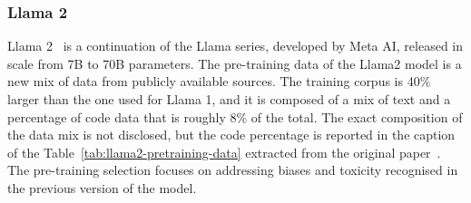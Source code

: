 \subsubsection{Llama 2}
\label{subsubsec:llama-2}

Llama 2~\cite{touvron2023llama2} is a continuation of the Llama series, developed by Meta AI, released in scale from 7B to 70B parameters.
The pre-training data of the Llama2 model is a new mix of data from publicly available sources.
The training corpus is 40\% larger than the one used for Llama 1, and it is composed of a mix of text and a percentage of code data that is roughly 8\% of the total.
The exact composition of the data mix is not disclosed, but the code percentage is reported in the caption of the Table~\ref{tab:llama2-pretraining-data} extracted from the original paper~\cite{touvron2023llama2}.
The pre-training selection focuses on addressing biases and toxicity recognised in the previous version of the model.

